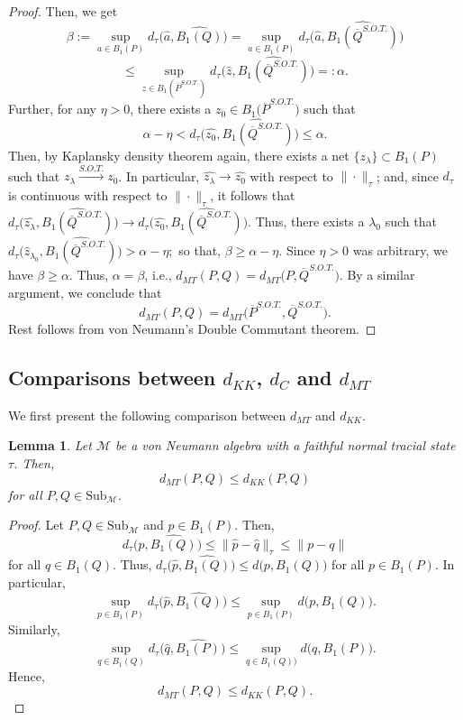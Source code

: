 \documentclass{amsart}
\numberwithin{equation}{section}
\newcommand{\1}{\mathbf{1}}
\newcommand{\mM}{\mathcal{M}}
\newtheorem{lemma}[theorem]{Lemma}
\begin{document}
\begin{proof}
Then, we get
\[
\beta := \sup_{a\in B_1(P)}d_\tau \big(\widehat{a}, \widehat{B_1(Q)}\big)=
\sup_{a\in B_1(P)}d_\tau \Big(\widehat{a},
\widehat{B_1(\overline{Q}^{S.O.T.})}\Big)\]
\[
\leq \sup_{z\in
  B_1(\overline{P}^{S.O.T.})}d_\tau\Big(\widehat{z},
\widehat{B_1(\overline{Q}^{S.O.T.})}\Big)=: \alpha.
\] 
Further, for any  $\eta>0$, there exists a $ z_{0}\in
B_1\Big(\overline{P}^{S.O.T.}\Big)$ such that
\[
\alpha-\eta<
d_\tau \Big(\widehat{z_{0}}, \widehat{B_1(\overline{Q}^{S.O.T.})}\Big)\leq
\alpha.
\]
Then, by Kaplansky density theorem again, there exists a net
$\{z_{\lambda }\} \subset B_1(P)$ such that $z_{\lambda
}\stackrel{S.O.T.}{\longrightarrow} z_{0}$. In particular,
$\widehat{z_{\lambda}} {\longrightarrow} \widehat{z_{0}}$ with respect
to $\|\cdot\|_\tau$; and, since $d_\tau$ is continuous with respect to
$\|\cdot\|_\tau$, it follows that \( d_\tau \Big(\widehat{{z}_{\lambda }},
\widehat{B_1(\overline{Q}^{S.O.T.})}\Big)\rightarrow
d_\tau\Big(\widehat{z_{0}}, \widehat{B_1(\overline{Q}^{S.O.T.})}\Big).  \)
Thus, there exists a $\lambda_{0}$ such that \( d_\tau
\Big(\widehat{z}_{\lambda_{0}}, \widehat{B_1(\overline{Q}^{S.O.T.})}\Big)>\alpha-
\eta; \) so that, $\beta \geq \alpha-\eta$. Since $\eta > 0$ was
arbitrary, we have $\beta\geq \alpha$. Thus, $\alpha=\beta$, i.e., \(
d_{MT}(P, Q)= d_{MT}\Big({P}, \overline{Q}^{S.O.T.}\Big).  \) By a similar
argument, we conclude that
\[
d_{MT}(P, Q)= d_{MT}\Big(\overline{P}^{S.O.T.}, \overline{Q}^{S.O.T.}\Big).
\]
Rest follows from von Neumann's Double
Commutant theorem.
\end{proof}


\subsection{Comparisons between $d_{KK}$, $d_C$ and $d_{MT}$}




We first present the following comparison between $d_{MT}$ and $d_{KK}$. 
\begin{lemma}\label{dMT-dKK}
  Let $\mM$ be a von Neumann algebra with a faithful normal tracial
  state $\tau$.  Then,
$$d_{MT}(P, Q)\leq d_{KK}(P, Q)$$
  for all $P, Q \in \mathrm{Sub}_{\mM}$.

\end{lemma}

\begin{proof} Let $P, Q \in \mathrm{Sub}_{\mM}$ and 
$p \in B_1(P)$. Then, 
\[
d_\tau \Big(\widehat{p}, \widehat{B_1(Q)}\Big)\leq \|\widehat{p}- \widehat{q}\|_{\tau}\leq \| p- q\| 
\]
for all $ q \in B_1(Q)$. Thus, 
\(
d_\tau \Big(\widehat{p}, \widehat{B_1(Q)}\Big) \leq d\big(p , B_1(Q)\big)
\) for all $p \in B_1(P)$. In particular, 
\[
\sup_{ p \in B_1(P )}d_\tau \Big(\widehat{p}, \widehat{B_1(Q)}\Big)\leq \sup_{ p \in B_1(P )}d\big( p , B_1(Q)\big).\]
Similarly, 
\[
\sup_{q \in B_1(Q )}d_\tau \Big(\widehat{q}, \widehat{B_1(P)}\Big)\leq \sup_{q \in B_1(Q))}d\big(q, B_1(P)\big).
\]
Hence, 
\[
d_{MT}(P , Q)\leq d_{KK}(P, Q).
\]
\end{proof}
\end{document}
